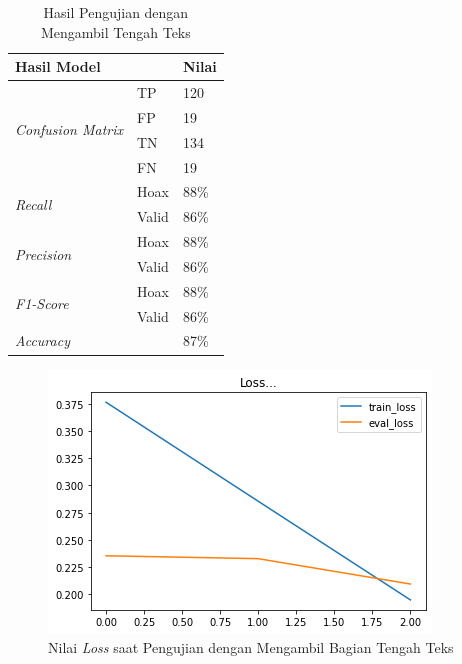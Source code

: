 \begin{table}[]
    \caption{Hasil Pengujian dengan Mengambil Tengah Teks}
    \label{tab: const_tengah}
    \centering
    \begin{tabular}{|l|l|l|}
        \hline
        \multicolumn{2}{|l|}{\textbf{Hasil Model}} & \textbf{Nilai}        \\ \hline
        \multirow{4}{*}{\textit{Confusion Matrix}} & TP             & 120  \\ \cline{2-3}
                                                   & FP             & 19   \\ \cline{2-3}
                                                   & TN             & 134  \\ \cline{2-3}
                                                   & FN             & 19   \\ \hline
        \multirow{2}{*}{\textit{Recall}}           & Hoax           & 88\% \\ \cline{2-3}
                                                   & Valid          & 86\% \\ \hline
        \multirow{2}{*}{\textit{Precision}}        & Hoax           & 88\% \\ \cline{2-3}
                                                   & Valid          & 86\% \\ \hline
        \multirow{2}{*}{\textit{F1-Score}}         & Hoax           & 88\% \\ \cline{2-3}
                                                   & Valid          & 86\% \\ \hline
        \multicolumn{2}{|l|}{\textit{Accuracy}}    & 87\%                  \\ \hline
    \end{tabular}
\end{table}

\begin{figure}[h]
    \begin{center}
        \includegraphics[width= 0.9\linewidth]{gambar/loss_concat_tengah.png}
        \caption{Nilai \textit{Loss} saat Pengujian dengan Mengambil Bagian Tengah Teks}
        \label{fig: loss_const_tengah}
    \end{center}
\end{figure}


